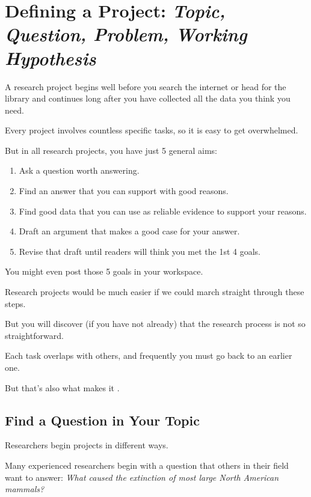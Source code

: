 \documentclass[oneside]{book}
\numberwithin{equation}{section}
\begin{document}

\chapter{Defining a Project: \textit{Topic, Question, Problem, Working Hypothesis}}

A research project begins well before you search the internet or head for the library and continues long after you have collected all the data you think you need.

Every project involves countless specific tasks, so it is easy to get overwhelmed.

But in all research projects, you have just 5 general aims:
\begin{enumerate}
    \item Ask a question worth answering.
    \item Find an answer that you can support with good reasons.
    \item Find good data that you can use as reliable evidence to support your reasons.
    \item Draft an argument that makes a good case for your answer.
    \item Revise that draft until readers will think you met the 1st 4 goals.
\end{enumerate}
You might even post those 5 goals in your workspace.

%
Research projects would be much easier if we could march straight through these steps.

But you will discover (if you have not already) that the research process is not so straightforward.

Each task overlaps with others, and frequently you must go back to an earlier one.


But that's also what makes it .

\section{Find a Question in Your Topic}
Researchers begin projects in different ways.

Many experienced researchers begin with a question that others in their field want to answer: \textit{What caused the extinction of most large North American mammals?}
\end{document}
